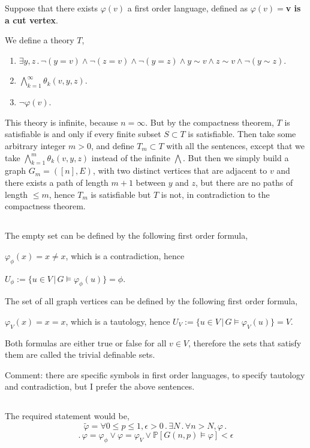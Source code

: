 \documentclass{article}
\begin{document}
Suppose that there exists $\varphi(v)$ a first order language, defined as $\varphi(v)=$\textbf{v is a cut vertex}.

We define a theory $T$,
\begin{enumerate}
    \item $\exists{y,z}\,.\,\neg(y=v)\land\neg(z=v)\land\neg(y=z)\land{y\sim{v}}\land{z\sim{v}}\land\neg(y\sim{z})$.
    \item 
    $\bigwedge_{k=1}^\infty\theta_k(v,y,z)$.
    \item 
    $\neg\varphi(v)$.
\end{enumerate}

This theory is infinite, because $n=\infty$. But by the compactness theorem, $T$ is satisfiable is and only if every finite subset $S\subset{T}$ is satisfiable.
Then take some arbitrary integer $m>0$, and define $T_m\subset{T}$ with all the sentences, except that we take $\bigwedge_{k=1}^m\theta_k(v,y,z)$ instead of the infinite $\bigwedge$.
But then we simply build a graph $G_m=([n],E)$, with two distinct vertices that are adjacent to $v$ and there exists a path of length $m+1$ between $y$ and $z$, but there are no paths of length $\leq{m}$, hence $T_m$ is satisfiable but $T$ is not, in contradiction to the compactness theorem.
\subsection{}
The empty set can be defined by the following first order formula,

$\varphi_\phi(x)=x\neq{x}$, which is a contradiction, hence 

$U_\phi:=\{u\in{V}\,|\,{G\vDash\varphi_\phi(u)}\}=\phi$.

The set of all graph vertices can be defined by the following first order formula,

$\varphi_V(x)=x=x$, which is a tautology, hence $U_V:=\{u\in{V}\,|\,{G\vDash\varphi_V(u)}\}=V$.

Both formulas are either true or false for all $v\in{V}$, therefore the sets that satisfy them are called the trivial definable sets.

Comment: there are specific symbols in first order languages, to specify tautology and contradiction, but I prefer the above sentences.
\subsection{}
The required statement would be,
\noindent
\[\tilde\varphi=\forall{0\leq{p}\leq{1}},\epsilon>0\,.\,\exists{N}\,.\,\forall{n>N},\varphi\,.\,\]\[.\,\varphi=\varphi_\phi\lor\varphi=\varphi_V\lor\mathbb{P}[G(n,p)\vDash\varphi]<\epsilon\]
\end{document}
